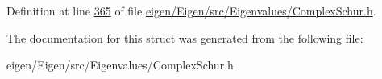Definition at line \hyperlink{eigen_2_eigen_2src_2_eigenvalues_2_complex_schur_8h_source_l00365}{365} of file \hyperlink{eigen_2_eigen_2src_2_eigenvalues_2_complex_schur_8h_source}{eigen/\+Eigen/src/\+Eigenvalues/\+Complex\+Schur.\+h}.



The documentation for this struct was generated from the following file\+:\begin{DoxyCompactItemize}
\item 
eigen/\+Eigen/src/\+Eigenvalues/\+Complex\+Schur.\+h\end{DoxyCompactItemize}
